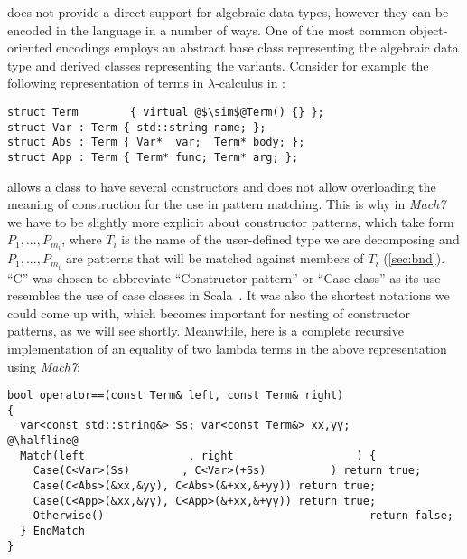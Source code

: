 \Cpp{} does not provide a direct support for algebraic data types, however they 
can be encoded in the language in a number of ways. One of the most common 
object-oriented encodings employs an abstract base class representing the 
algebraic data type and derived classes representing the variants. Consider for 
example the following representation of terms in $\lambda$-calculus in \Cpp{}:

\begin{lstlisting}[columns=flexible]
struct Term        { virtual @$\sim$@Term() {} };
struct Var : Term { std::string name; };
struct Abs : Term { Var*  var;  Term* body; };
struct App : Term { Term* func; Term* arg; };
\end{lstlisting}

\noindent
\Cpp{} allows a class to have several constructors and does not allow 
overloading the meaning of construction for the use in pattern matching. This is
why in \emph{Mach7} we have to be slightly more explicit about constructor patterns, 
which take form $P_1,...,P_{m_i}$\code{)}, where $T_i$ is the name of 
the user-defined type we are decomposing and $P_1,...,P_{m_i}$ are patterns that 
will be matched against members of $T_i$ (\textsection\ref{sec:bnd}). ``C'' was
chosen to abbreviate ``Constructor pattern'' or ``Case class'' as its use 
resembles the use of case classes in Scala~\cite{Scala2nd}. It was also the 
shortest notations we could come up with, which becomes important for nesting of 
constructor patterns, as we will see shortly. Meanwhile, here is a complete 
recursive implementation of an equality of two lambda terms in the above 
representation using \emph{Mach7}:

\begin{lstlisting}[keepspaces]
bool operator==(const Term& left, const Term& right)
{
  var<const std::string&> Ss; var<const Term&> xx,yy;
@\halfline@
  Match(left                , right                   ) {
    Case(C<Var>(Ss)        , C<Var>(+Ss)          ) return true;
    Case(C<Abs>(&xx,&yy), C<Abs>(&+xx,&+yy)) return true;
    Case(C<App>(&xx,&yy), C<App>(&+xx,&+yy)) return true;
    Otherwise()                                         return false;
  } EndMatch
}
\end{lstlisting}

